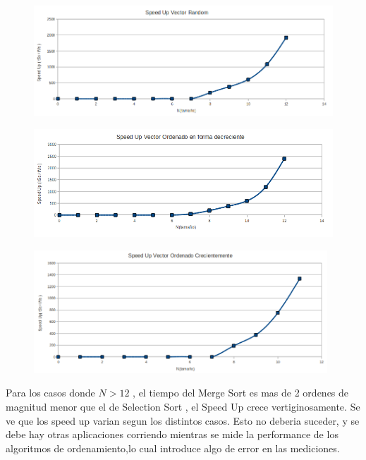 \begin{figure}[!htp]
\begin{center}
\includegraphics[width=12cm]{Imagenes/SpeedUpVectorRandom.png}
\end{center}
\end{figure} 

\begin{figure}[!htp]
\begin{center}
\includegraphics[width=12cm]{Imagenes/SpeedUpVectorOrdenadoEnFormaDecreciente.png}
\end{center}
\end{figure} 


\begin{figure}[!htp]
\begin{center}
\includegraphics[width=11cm]{Imagenes/SpeedUpVectorOrdenadoEnFormaCreciente.png}
\end{center}
\end{figure} 

\newpage

Para los casos donde $N>12$ , el tiempo del Merge Sort es mas de 2 ordenes de magnitud menor que el de Selection Sort , el Speed Up crece vertiginosamente.
Se ve que los speed up varian segun los distintos casos. Esto no deberia suceder, y se debe hay otras aplicaciones corriendo mientras
se mide la performance de los algoritmos de ordenamiento,lo cual introduce algo de error en las mediciones.

